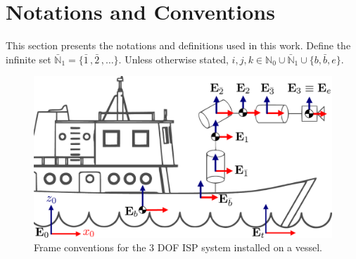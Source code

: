 \section{Notations and Conventions}
\label{sec:definitions}

This section presents the notations and definitions used in this work. Define the infinite set $\mathbb{\bar{N}}_1 = \{ \bar{1}\,, \bar{2}\,, \hdots \}$. Unless otherwise stated, $i, j, k \in \mathbb{N}_0 \cup \mathbb{\bar{N}}_1 \cup \{b,\bar{b},e\}$.
%
\begin{figure}[ht]
    \centering
    \includegraphics[width=1\columnwidth]{figs/ship_conventions.pdf}
    \caption{Frame conventions for the 3 DOF ISP system installed on a vessel.}
    \label{fig:HEADS_convention}
\end{figure}

